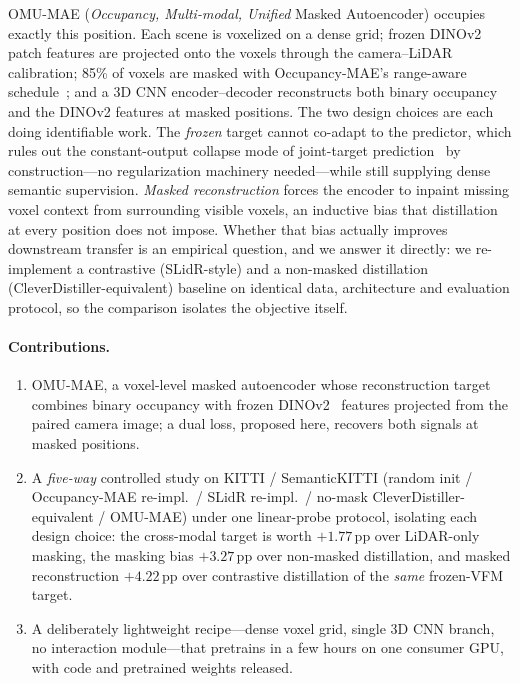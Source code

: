 OMU-MAE (\emph{Occupancy, Multi-modal, Unified} Masked Autoencoder)
occupies exactly this position. Each scene is voxelized on a dense
grid; frozen DINOv2 patch features are projected onto the voxels
through the camera--LiDAR calibration; 85\% of voxels are masked with
Occupancy-MAE's range-aware schedule~\cite{occmae}; and a 3D CNN
encoder--decoder reconstructs both binary occupancy and the DINOv2
features at masked positions. The two design choices are each doing
identifiable work. The \emph{frozen} target cannot co-adapt to the
predictor, which rules out the constant-output collapse mode of
joint-target prediction~\cite{ijepa,lejepa} by construction---no
regularization machinery needed---while still supplying dense semantic
supervision. \emph{Masked reconstruction} forces the encoder to inpaint
missing voxel context from surrounding visible voxels, an inductive
bias that distillation at every position does not impose. Whether that
bias actually improves downstream transfer is an empirical question,
and we answer it directly: we re-implement a contrastive (SLidR-style)
and a non-masked distillation (CleverDistiller-equivalent) baseline on
identical data, architecture and evaluation protocol, so the comparison
isolates the objective itself.

\paragraph{Contributions.}
\begin{enumerate}
\item OMU-MAE, a voxel-level masked autoencoder whose reconstruction
target combines binary occupancy with frozen DINOv2~\cite{dinov2}
features projected from the paired camera image; a dual loss, proposed
here, recovers both signals at masked positions.
\item A \emph{five-way} controlled study on KITTI / SemanticKITTI
(random init / Occupancy-MAE re-impl.\ / SLidR re-impl.\ / no-mask
CleverDistiller-equivalent / OMU-MAE) under one linear-probe protocol,
isolating each design choice: the cross-modal target is worth
$+1.77$\,pp over LiDAR-only masking, the masking bias $+3.27$\,pp over
non-masked distillation, and masked reconstruction $+4.22$\,pp over
contrastive distillation of the \emph{same} frozen-VFM target.
\item A deliberately lightweight recipe---dense voxel grid, single
3D CNN branch, no interaction module---that pretrains in a few hours on
one consumer GPU, with code and pretrained weights released.
\end{enumerate}
